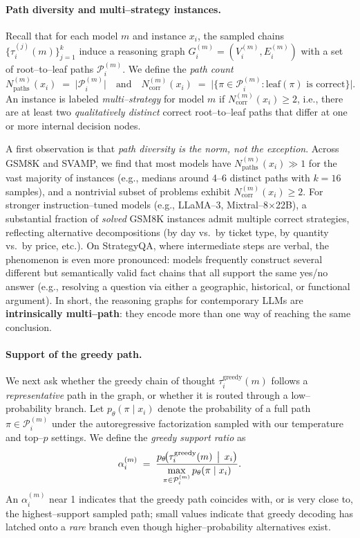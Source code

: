\paragraph{Path diversity and multi--strategy instances.}
Recall that for each model $m$ and instance $x_i$, the sampled chains
$\{\tau_i^{(j)}(m)\}_{j=1}^k$ induce a reasoning graph
$G_i^{(m)} = (V_i^{(m)}, E_i^{(m)})$ with a set of root--to--leaf paths
$\mathcal{P}_i^{(m)}$.
We define the \emph{path count}
\[
  N_{\text{paths}}^{(m)}(x_i)
  \;=\;
  \bigl|\mathcal{P}_i^{(m)}\bigr|
  \quad\text{and}\quad
  N_{\text{corr}}^{(m)}(x_i)
  \;=\;
  \bigl|\{\pi \in \mathcal{P}_i^{(m)} : \text{leaf}(\pi)
  \text{ is correct}\}\bigr|.
\]
An instance is labeled \emph{multi--strategy} for model $m$ if
$N_{\text{corr}}^{(m)}(x_i) \ge 2$, i.e., there are at least two
\emph{qualitatively distinct} correct root--to--leaf paths that differ at
one or more internal decision nodes.

A first observation is that \emph{path diversity is the norm, not the
exception}.
Across GSM8K and SVAMP, we find that most models have
$N_{\text{paths}}^{(m)}(x_i) \gg 1$ for the vast majority of instances
(e.g., medians around 4–6 distinct paths with $k{=}16$ samples),
and a nontrivial subset of problems exhibit
$N_{\text{corr}}^{(m)}(x_i) \ge 2$.
For stronger instruction--tuned models (e.g., LLaMA--3,
Mixtral--8$\times$22B), a substantial fraction of \emph{solved} GSM8K
instances admit multiple correct strategies, reflecting alternative
decompositions (by day vs.\ by ticket type, by quantity vs.\ by price,
etc.).
On StrategyQA, where intermediate steps are verbal, the phenomenon is
even more pronounced: models frequently construct several different but
semantically valid fact chains that all support the same yes/no answer
(e.g., resolving a question via either a geographic, historical, or
functional argument).
In short, the reasoning graphs for contemporary LLMs are
\textbf{intrinsically multi--path}: they encode more than one way of
reaching the same conclusion.

\paragraph{Support of the greedy path.}
We next ask whether the greedy chain of thought
$\tau_i^{\mathrm{greedy}}(m)$ follows a \emph{representative} path in the
graph, or whether it is routed through a low--probability branch.
Let $p_\theta(\pi \mid x_i)$ denote the probability of a full path
$\pi \in \mathcal{P}_i^{(m)}$ under the autoregressive factorization
sampled with our temperature and top--$p$ settings.
We define the \emph{greedy support ratio} as
\[
  \alpha_i^{(m)}
  \;=\;
  \frac{p_\theta\!\bigl(\tau_i^{\mathrm{greedy}}(m)\,\bigm|\,x_i\bigr)}
       {\displaystyle \max_{\pi \in \mathcal{P}_i^{(m)}} 
        p_\theta(\pi \mid x_i)}.
\]
An $\alpha_i^{(m)}$ near 1 indicates that the greedy path coincides
with, or is very close to, the highest--support sampled path; small
values indicate that greedy decoding has latched onto a \emph{rare}
branch even though higher--probability alternatives exist.

